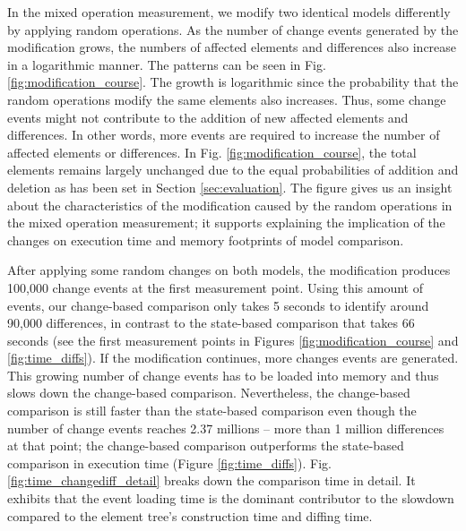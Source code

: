 In the mixed operation measurement, we modify two identical models differently by applying random operations. As the number of change events generated by the modification grows, the numbers of affected elements and differences also increase in a logarithmic manner. The patterns can be seen in Fig. \ref{fig:modification_course}. The growth is logarithmic since the probability that the random operations modify the same elements also increases. Thus, some change events might not contribute to the addition of new affected elements and differences. In other words, more events are required to increase the number of affected elements or differences. In Fig. \ref{fig:modification_course}, the total elements remains largely unchanged due to the equal probabilities of addition and deletion as has been set in Section \ref{sec:evaluation}. The figure gives us an insight about the characteristics of the modification caused by the random operations in the mixed operation measurement; it supports explaining the implication of the changes on execution time and memory footprints of model comparison.

After applying some random changes on both models, the modification produces 100,000 change events at the first measurement point. Using this amount of events, our change-based comparison only takes 5 seconds to identify around 90,000 differences, in contrast to the state-based comparison that takes 66 seconds (see the first measurement points in Figures \ref{fig:modification_course} and \ref{fig:time_diffs}). If the modification continues, more changes events are generated. This growing number of change events has to be loaded into memory and thus slows down the change-based comparison. Nevertheless, the change-based comparison is still faster than the state-based comparison even though the number of change events reaches 2.37 millions -- more than 1 million differences at that point; the change-based comparison outperforms the state-based comparison in execution time (Figure \ref{fig:time_diffs}). Fig. \ref{fig:time_changediff_detail} breaks down the comparison time in detail. It exhibits that the event loading time is the dominant contributor to the slowdown compared to the element tree's construction time and diffing time. 

